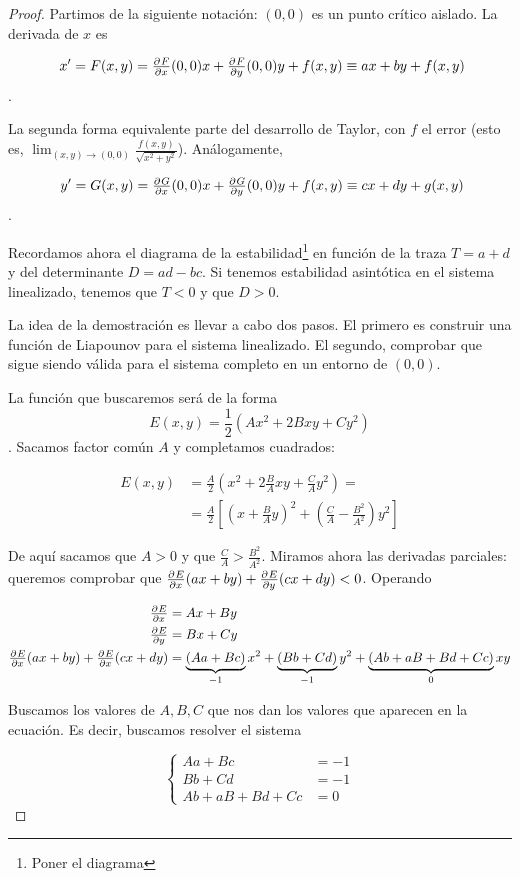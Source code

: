 \begin{proof}
Partimos de la siguiente notación: $(0,0)$ es un punto crítico aislado. La derivada de $x$ es

\[ x' = F(x,y) = \pd{F}{x}(0,0)x + \pd{F}{y}(0,0)y + f(x,y) \equiv ax + by + f(x,y) \].

La segunda forma equivalente parte del desarrollo de Taylor, con $f$ el error (esto es, $\lim_{(x,y)\to (0,0)} \frac{f(x,y)}{\sqrt{x^2+y^2}}$). Análogamente,

\[ y' = G(x,y) = \pd{G}{x}(0,0)x + \pd{G}{y}(0,0)y + f(x,y) \equiv cx + dy + g(x,y) \].

Recordamos ahora el diagrama de la estabilidad\footnote{Poner el diagrama} en función de la traza $T=a+d$ y del determinante $D=ad-bc$. Si tenemos estabilidad asintótica en el sistema linealizado, tenemos que $T < 0$ y que $D > 0$.

La idea de la demostración es llevar a cabo dos pasos. El primero es construir una función de Liapounov para el sistema linealizado. El segundo, comprobar que sigue siendo válida para el sistema completo en un entorno de $(0,0)$.

La función que buscaremos será de la forma \[ E(x,y) = \frac{1}{2}\left(Ax^2 + 2Bxy + Cy^2\right) \]. Sacamos factor común $A$ y completamos cuadrados:

\begin{align*}
 E(x,y) &= \frac{A}{2}\left(x^2 + 2\frac{B}{A}xy + \frac{C}{A}y^2\right) = \\
 &= \frac{A}{2}\left[\left(x+\frac{B}{A}y\right)^2 + \left(\frac{C}{A} - \frac{B^2}{A^2}\right)y^2\right]
\end{align*}

De aquí sacamos que $A>0$ y que $\frac{C}{A}>\frac{B^2}{A^2}$. Miramos ahora las derivadas parciales: queremos comprobar que $\pd{E}{x}(ax+by) + \pd{E}{y} (cx+dy) < 0$. Operando

\begin{align*}
\pd{E}{x} &= Ax+By \\
\pd{E}{y} &= Bx + Cy \\
\pd{E}{x} (ax+by) + \pd{E}{x}(cx+dy) &=
	\underbrace{(Aa+Bc)}_{-1}x^2 +
	\underbrace{(Bb+Cd)}_{-1}y^2 +
	\underbrace{(Ab+aB+Bd+Cc)}_{0}xy
\end{align*}

Buscamos los valores de $A,B,C$ que nos dan los valores que aparecen en la ecuación. Es decir, buscamos resolver el sistema

\[ \begin{cases} Aa + Bc &= -1 \\ 
Bb+Cd &= -1 \\
Ab + aB +Bd + Cc &= 0
\end{cases} \]


\end{proof}

